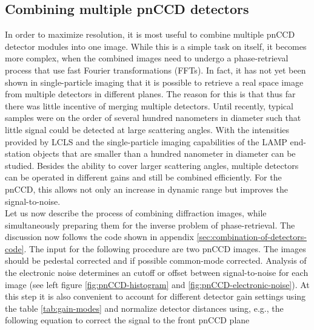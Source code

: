 \subsection{Combining multiple pnCCD detectors}\label{sec:combination-of-images}
In order to maximize resolution, it is most useful to combine multiple pnCCD detector modules into one image. While this is a simple task on itself, it becomes more complex, when the combined images need to undergo a phase-retrieval process that use fast Fourier transformations (FFTs). In fact, it has not yet been shown in single-particle imaging that it is possible to retrieve a real space image from multiple detectors in different planes.
The reason for this is that thus far there was little incentive of merging multiple detectors. Until recently, typical samples were on the order of several hundred nanometers in diameter such that little signal could be detected at large scattering angles. With the intensities provided by LCLS and the single-particle imaging capabilities of the LAMP end-station objects that are smaller than a hundred nanometer in diameter can be studied.
Besides the ability to cover larger scattering angles, multiple detectors can be operated in different gains and still be combined efficiently. For the pnCCD, this allows not only an increase in dynamic range but improves the signal-to-noise.\\
Let us now describe the process of combining diffraction images, while simultaneously preparing them for the inverse problem of phase-retrieval. The discussion now follows the code shown in appendix \ref{sec:combination-of-detectors-code}. The input for the following procedure are two pnCCD images. The images should be pedestal corrected and if possible common-mode corrected. Analysis of the electronic noise determines an cutoff or offset between signal-to-noise for each image (see left figure \ref{fig:pnCCD-histogram} and \ref{fig:pnCCD-electronic-noise}). At this step it is also convenient to account for different detector gain settings using the table \ref{tab:gain-modes} and normalize detector distances using, e.g., the following equation to correct the signal to the front pnCCD plane
